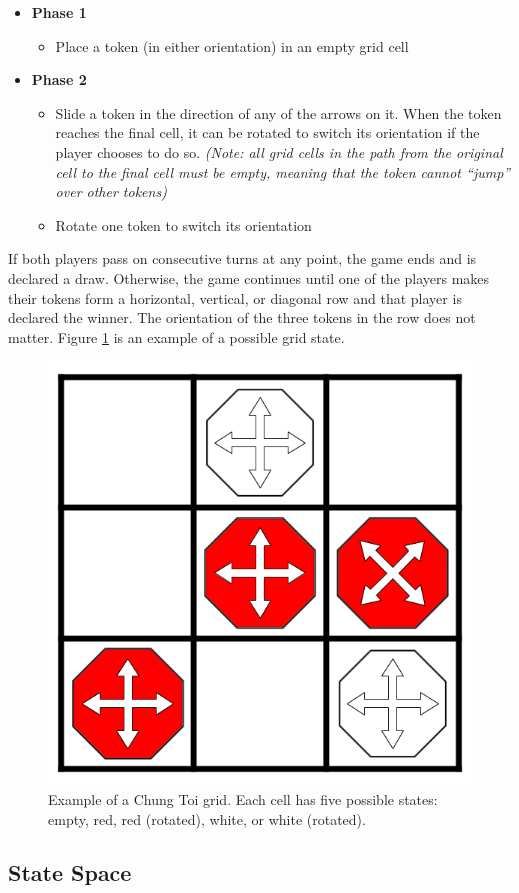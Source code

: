 \documentclass[11pt,a4paper]{report}
\begin{document}
\begin{itemize}

	\item \textbf{Phase 1}
		\begin{itemize}
			\item Place a token (in either orientation) in an empty grid cell
		\end{itemize}

	\item \textbf{Phase 2}
		\begin{itemize}
			\item Slide a token in the direction of any of the arrows on it. When the token reaches the final cell, it can be rotated to switch its orientation if the player chooses to do so. \emph{(Note: all grid cells in the path from the original cell to the final cell must be empty, meaning that the token cannot ``jump'' over other tokens)}
			\item Rotate one token to switch its orientation
		\end{itemize}

\end{itemize}

If both players pass on consecutive turns at any point, the game ends and is declared a draw. Otherwise, the game continues until one of the players makes their tokens form a horizontal, vertical, or diagonal row and that player is declared the winner. The orientation of the three tokens in the row does not matter. Figure \ref{chung-toi-grid-example} is an example of a possible grid state.

\begin{figure}[htbp]
	\begin{center}
		\includegraphics[width=0.3\linewidth]{chung_toi_grid_example.png}
		\caption{Example of a Chung Toi grid. Each cell has five possible states: empty, red, red (rotated), white, or white (rotated).}
		\label{chung-toi-grid-example}
	\end{center}
\end{figure}


\subsection{State Space}
\end{document}
